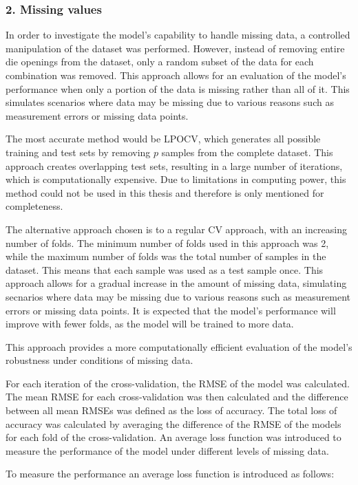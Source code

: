 \subsubsection*{2. Missing values}

In order to investigate the model's capability to handle missing data, a controlled manipulation
of the dataset was performed.
However, instead of removing entire die openings from the dataset, only a random subset of
the data for each combination was removed.
This approach allows for an evaluation of the model's performance when only a portion of the data
is missing rather than all of it.
This simulates scenarios where data may be missing due to various reasons such as measurement
errors or missing data points.

The most accurate method would be \ac{LPOCV}, which generates all possible training and test
sets by removing $p$ samples from the complete dataset.
This approach creates overlapping test sets, resulting in a large number of iterations, which is
computationally expensive.
Due to limitations in computing power, this method could not be used in this thesis and therefore
is only mentioned for completeness.

The alternative approach chosen is to a regular \ac{CV} approach, with an increasing
number of folds.
The minimum number of folds used in this approach was 2, while the maximum number of folds was
the total number of samples in the dataset. This means that each sample was used as a test sample
once.
This approach allows for a gradual increase in the amount of missing data, simulating secnarios
where data may be missing due to various reasons such as measurement errors or missing data points.
It is expected that the
model's performance will improve with fewer folds, as the model will be trained to more data.

This approach provides a more computationally efficient evaluation of the model's robustness
under conditions of missing data.

For each iteration of the cross-validation, the \ac{RMSE} of the model was
calculated.
The mean \ac{RMSE} for each cross-validation was then calculated and the difference
between all mean RMSEs was defined as the loss of accuracy.
The total loss of accuracy was calculated by averaging the difference of the RMSE of the models
for each fold of the
cross-validation.
An average loss function was introduced to measure the performance of the model under different
levels of missing data.

To measure the performance an average loss function is introduced as follows:

